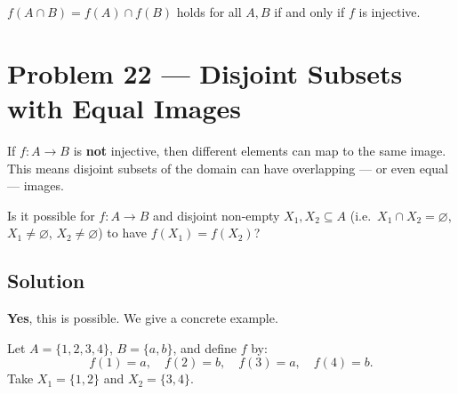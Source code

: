 \documentclass[12pt, a4paper]{article}
\begin{document}
\begin{answerbox}
$f(A \cap B) = f(A) \cap f(B)$ holds for all $A, B$ if and only if $f$ is injective.
\end{answerbox}

\newpage
\section{Problem 22 --- Disjoint Subsets with Equal Images}

\begin{theorybox}
If $f : A \to B$ is \textbf{not} injective, then different elements can map to the same
image. This means disjoint subsets of the domain can have overlapping --- or even equal --- images.
\end{theorybox}

\begin{problembox}
Is it possible for $f : A \to B$ and disjoint non-empty $X_1, X_2 \subseteq A$
(i.e.\ $X_1 \cap X_2 = \varnothing$, $X_1 \neq \varnothing$, $X_2 \neq \varnothing$)
to have $f(X_1) = f(X_2)$?
\end{problembox}

\subsection*{Solution}

\textbf{Yes}, this is possible. We give a concrete example.

Let $A = \{1, 2, 3, 4\}$, $B = \{a, b\}$, and define $f$ by:
\[
  f(1) = a, \quad f(2) = b, \quad f(3) = a, \quad f(4) = b.
\]
Take $X_1 = \{1, 2\}$ and $X_2 = \{3, 4\}$.
\end{document}
